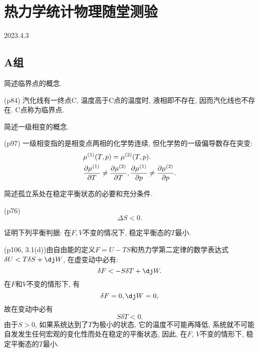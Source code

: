 \section{热力学统计物理随堂测验}
2023.4.3
\subsection{A组}
\begin{questions}
  \question 简述临界点的概念.
  \begin{solution}
    (p84) 汽化线有一终点C, 温度高于C点的温度时, 液相即不存在, 因而汽化线也不存在. C点称为临界点.
  \end{solution}
  \question 简述一级相变的概念.
  \begin{solution}
    (p97) 一级相变指的是相变点两相的化学势连续, 但化学势的一级偏导数存在突变:
    \begin{equation}
      \begin{aligned}
         & \mu^{(1)}(T,p) = \mu^{(2)}(T,p).                                                    \\
         & \pdv{\mu^{(1)}}{T}\neq\pdv{\mu^{(2)}}{T}, \pdv{\mu^{(1)}}{p}\neq\pdv{\mu^{(2)}}{p}.
      \end{aligned}
    \end{equation}
  \end{solution}
  \question 简述孤立系处在稳定平衡状态的必要和充分条件.
  \begin{solution}
    (p76)
    \begin{equation}
      \Delta S < 0.
    \end{equation}
  \end{solution}
  \question 证明下列平衡判据: 在$F, V$不变的情况下, 稳定平衡态的$T$最小.
  \begin{solution}
    (p106, 3.1(d))由自由能的定义$F=U-TS$和热力学第二定律的数学表达式$\delta U < T\delta S + \dj W$, 在虚变动中必有:
    \begin{equation}
      \delta F < -S\delta T +\dj W.
    \end{equation}
    在$F$和$V$不变的情形下, 有
    \begin{equation}
      \delta F = 0, \dj W = 0,
    \end{equation}
    故在变动中必有
    \begin{equation}
      S\delta T <0.
    \end{equation}
    由于$S>0$, 如果系统达到了$T$为极小的状态, 它的温度不可能再降低, 系统就不可能自发发生任何宏观的变化性而处在稳定的平衡状态, 因此, 在$F$, $V$不变的情形下, 稳定平衡态的$T$最小.
  \end{solution}
\end{questions}
